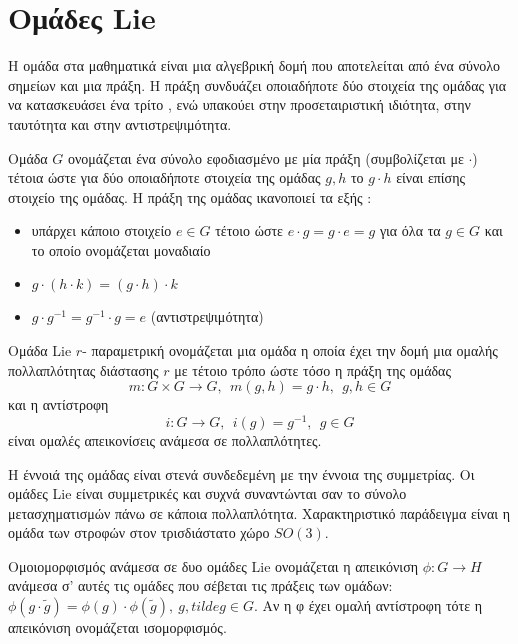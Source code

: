 \section{Ομάδες \textlatin{Lie}}

Η ομάδα στα μαθηματικά είναι μια αλγεβρική δομή που αποτελείται από ένα σύνολο σημείων και μια πράξη. Η πράξη συνδυάζει οποιαδήποτε δύο στοιχεία  της ομάδας για να κατασκευάσει ένα τρίτο , ενώ  υπακούει  στην προσεταιριστική ιδιότητα, στην ταυτότητα και στην αντιστρεψιμότητα. 
\begin{definition}
Ομάδα $G$ ονομάζεται ένα σύνολο εφοδιασμένο με μία πράξη (συμβολίζεται με $\cdot$) τέτοια ώστε  για  δύο οποιαδήποτε στοιχεία της ομάδας $g,h $ το $g \cdot h $ είναι επίσης στοιχείο της ομάδας. Η πράξη της ομάδας ικανοποιεί τα εξής : 
\begin{itemize}
\item υπάρχει κάποιο στοιχείο  $e \in G $ τέτοιο ώστε $e \cdot g = g\cdot e = g $ για όλα τα $g \in G$ και το οποίο ονομάζεται μοναδιαίο
\item $g \cdot (h\cdot k ) = (g\cdot h ) \cdot k$
\item $g \cdot g^{-1} = g^{-1} \cdot g = e $ (αντιστρεψιμότητα)
\end {itemize}
\end{definition}
\begin{definition}
Ομάδα \textlatin{Lie} $r$- παραμετρική ονομάζεται μια ομάδα η οποία έχει την δομή μια  ομαλής πολλαπλότητας διάστασης $r$ με τέτοιο τρόπο ώστε τόσο η πράξη της ομάδας
  \[m : G\times G \rightarrow G , ~ ~ m(g,h)=g \cdot h, ~ ~ g,h \in G \] 
  και η αντίστροφη 
  \[i : G \rightarrow G ,~~ i(g)= g^{-1}, ~~ g \in G \] 
  είναι ομαλές απεικονίσεις ανάμεσα σε πολλαπλότητες. 
\end{definition}
Η έννοιά της ομάδας είναι στενά συνδεδεμένη με την έννοια της συμμετρίας. Οι ομάδες \textlatin{Lie} είναι συμμετρικές και συχνά συναντώνται σαν το σύνολο  μετασχηματισμών πάνω σε κάποια πολλαπλότητα. Χαρακτηριστικό παράδειγμα είναι η ομάδα των  στροφών στον τρισδιάστατο χώρο $SO(3)$.

\begin{definition}
Ομοιομορφισμός ανάμεσα σε δυο ομάδες \textlatin{Lie} ονομάζεται η απεικόνιση $ \phi : G \rightarrow H $ ανάμεσα σ' αυτές τις ομάδες που σέβεται τις πράξεις των ομάδων: $ \phi(g \cdot \tilde{g}) = \phi(g) \cdot \phi(\tilde{g}), ~ g , tilde{g} \in G$.
Αν η φ έχει ομαλή αντίστροφη τότε η απεικόνιση ονομάζεται ισομορφισμός.
\end{definition}
\newpage